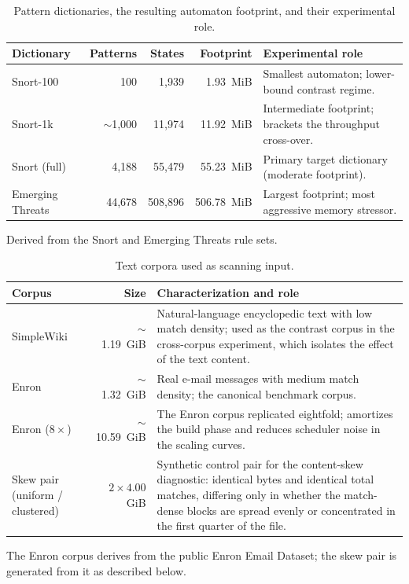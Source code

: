 \begin{table}[htbp]
    \centering
    \caption{Pattern dictionaries, the resulting automaton footprint, and their experimental role.}
    \label{tab:datasets}
    \small
    \begin{tabular}{@{} l r r r p{4.2cm} @{}}
        \toprule
        \textbf{Dictionary} & \textbf{Patterns} & \textbf{States} & \textbf{Footprint} & \textbf{Experimental role} \\
        \midrule
        Snort-100   & 100      & 1{,}939   & 1.93~MiB   & Smallest automaton; lower-bound contrast regime. \\ \addlinespace
        Snort-1k    & $\sim$1{,}000 & 11{,}974 & 11.92~MiB & Intermediate footprint; brackets the throughput cross-over. \\ \addlinespace
        Snort (full) & 4{,}188  & 55{,}479  & 55.23~MiB  & Primary target dictionary (moderate footprint). \\ \addlinespace
        Emerging Threats & 44{,}678 & 508{,}896 & 506.78~MiB & Largest footprint; most aggressive memory stressor. \\
        \bottomrule
    \end{tabular}

    {\footnotesize\raggedright Derived from the Snort and Emerging Threats rule sets.\par}
\end{table}

\begin{table}[htbp]
    \centering
    \caption{Text corpora used as scanning input.}
    \label{tab:corpora}
    \small
    \begin{tabular}{@{} l r p{7.2cm} @{}}
        \toprule
        \textbf{Corpus} & \textbf{Size} & \textbf{Characterization and role} \\
        \midrule
        SimpleWiki & $\sim$1.19~GiB & Natural-language encyclopedic text with low match density; used as the contrast corpus in the cross-corpus experiment, which isolates the effect of the text content. \\ \addlinespace
        Enron      & $\sim$1.32~GiB & Real e-mail messages with medium match density; the canonical benchmark corpus. \\ \addlinespace
        Enron ($8\times$) & $\sim$10.59~GiB & The Enron corpus replicated eightfold; amortizes the build phase and reduces scheduler noise in the scaling curves. \\ \addlinespace
        Skew pair (uniform / clustered) & $2 \times 4.00$~GiB & Synthetic control pair for the content-skew diagnostic: identical bytes and identical total matches, differing only in whether the match-dense blocks are spread evenly or concentrated in the first quarter of the file. \\
        \bottomrule
    \end{tabular}

    {\footnotesize\raggedright The Enron corpus derives from the public Enron Email Dataset; the skew pair is generated from it as described below.\par}
\end{table}

